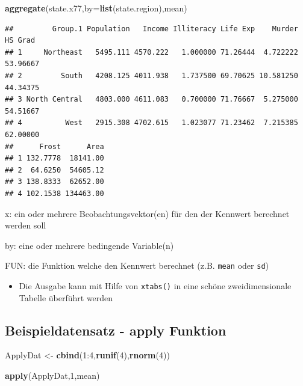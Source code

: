 \documentclass[]{article}
\newenvironment{Shaded}{\begin{snugshade}}{\end{snugshade}}
\newcommand{\KeywordTok}[1]{\textcolor[rgb]{0.13,0.29,0.53}{\textbf{{#1}}}}
\newcommand{\DataTypeTok}[1]{\textcolor[rgb]{0.13,0.29,0.53}{{#1}}}
\newcommand{\DecValTok}[1]{\textcolor[rgb]{0.00,0.00,0.81}{{#1}}}
\newcommand{\StringTok}[1]{\textcolor[rgb]{0.31,0.60,0.02}{{#1}}}
\newcommand{\NormalTok}[1]{{#1}}
\providecommand{\tightlist}{%
  \setlength{\itemsep}{0pt}\setlength{\parskip}{0pt}}
\begin{document}
\begin{Shaded}
\begin{Highlighting}[]
\KeywordTok{aggregate}\NormalTok{(state.x77,}\DataTypeTok{by=}\KeywordTok{list}\NormalTok{(state.region),mean)}
\end{Highlighting}
\end{Shaded}

\begin{verbatim}
##         Group.1 Population   Income Illiteracy Life Exp    Murder  HS Grad
## 1     Northeast   5495.111 4570.222   1.000000 71.26444  4.722222 53.96667
## 2         South   4208.125 4011.938   1.737500 69.70625 10.581250 44.34375
## 3 North Central   4803.000 4611.083   0.700000 71.76667  5.275000 54.51667
## 4          West   2915.308 4702.615   1.023077 71.23462  7.215385 62.00000
##      Frost      Area
## 1 132.7778  18141.00
## 2  64.6250  54605.12
## 3 138.8333  62652.00
## 4 102.1538 134463.00
\end{verbatim}

x: ein oder mehrere Beobachtungsvektor(en) für den der Kennwert
berechnet werden soll

by: eine oder mehrere bedingende Variable(n)

FUN: die Funktion welche den Kennwert berechnet (z.B. \texttt{mean} oder
\texttt{sd})

\begin{itemize}
\tightlist
\item
  Die Ausgabe kann mit Hilfe von \texttt{xtabs()} in eine schöne
  zweidimensionale Tabelle überführt werden
\end{itemize}

\subsection{Beispieldatensatz - apply
Funktion}\label{beispieldatensatz---apply-funktion}

\begin{Shaded}
\begin{Highlighting}[]
\NormalTok{ApplyDat <-}\StringTok{ }\KeywordTok{cbind}\NormalTok{(}\DecValTok{1}\NormalTok{:}\DecValTok{4}\NormalTok{,}\KeywordTok{runif}\NormalTok{(}\DecValTok{4}\NormalTok{),}\KeywordTok{rnorm}\NormalTok{(}\DecValTok{4}\NormalTok{))}
\end{Highlighting}
\end{Shaded}

\begin{Shaded}
\begin{Highlighting}[]
\KeywordTok{apply}\NormalTok{(ApplyDat,}\DecValTok{1}\NormalTok{,mean)}
\end{Highlighting}
\end{Shaded}
\end{document}
